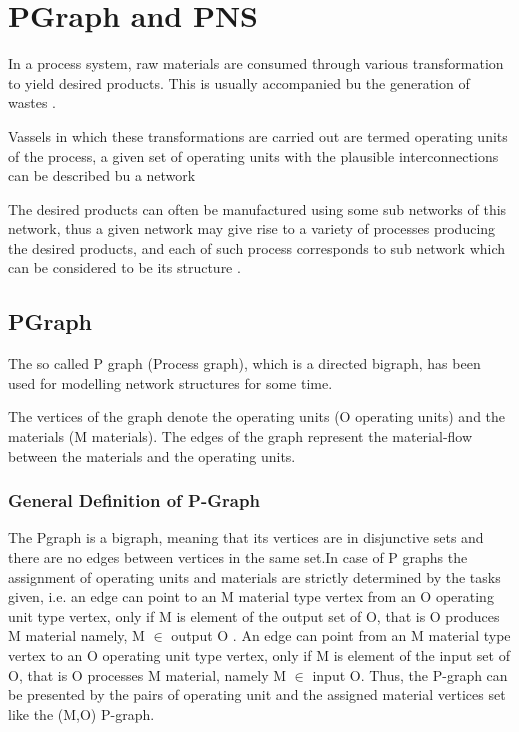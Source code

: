 
\chapter{\label{cha:pgraph}PGraph and PNS}

 
In a process system, raw materials are consumed through various transformation to yield desired products. 
This is usually accompanied bu the generation of wastes .

Vassels in which these transformations are carried out are termed operating units of the process, 
a given set of operating units with the plausible interconnections can be described bu a network 

The desired products can often be manufactured using some sub networks of this network, 
thus a given network may give rise to a variety of processes producing the desired products, 
and each of such process corresponds to sub network which can be considered  to be its structure \cite{omacs0}.
\section{ PGraph }


The so called P graph (Process graph), which is a directed bigraph, 
has been used for modelling network structures for some time.

The vertices of the graph denote the operating units (O operating units) and the materials (M materials).
The edges of the graph represent the material-flow between the materials and the operating units\cite{pns2, pns4}. 

\subsection{ General Definition of P-Graph }

The Pgraph is a bigraph, meaning that its vertices are in disjunctive sets 
and there are no edges between vertices in the same set.In case of P graphs the assignment of operating units and materials are strictly determined by the tasks given, i.e. an edge can point to an M material type vertex 
from an O operating unit type vertex, only if M is element of the output set of O, 
that is O produces M material namely, M $\in$ output O \cite{pns2}. 
An edge can point from an M material type vertex to an O operating unit type vertex, 
only if M is element of the input set of O, that is O processes M material, namely M  $\in$ input O. Thus, the P-graph can be presented by the pairs of operating unit and the assigned material vertices set like the (M,O) P-graph\cite{pns2}.

